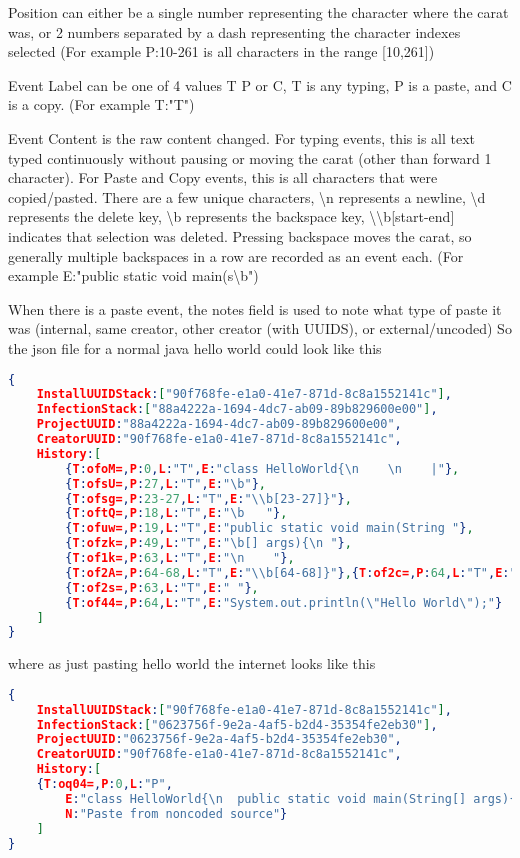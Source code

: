 \documentclass[12pt,final,thesis,actual]{uhthesis}
\newcommand{\n}{\hfill\break}
\begin{document}
Position can either be a single number representing the character where the carat was, or 2 numbers separated by a dash representing the character indexes selected (For example P:10-261 is all characters in the range [10,261])

Event Label can be one of 4 values T P or C, T is any typing, P is a paste, and C is a copy. (For example T:"T")

Event Content is the raw content changed.  For typing events, this is all text typed continuously without pausing or moving the carat (other than forward 1 character).  For Paste and Copy events, this is all characters that were copied/pasted.  There are a few unique characters, \textbackslash{}n represents a newline, \textbackslash{}d represents the delete key, \textbackslash{}b represents the backspace key, \textbackslash{}\textbackslash{}b[start-end] indicates that selection was deleted.  Pressing backspace moves the carat, so generally multiple backspaces in a row are recorded as an event each.    (For example E:"public static void main(s\textbackslash{}b")

When there is a paste event, the notes field is used to note what type of paste it was (internal, same creator, other creator (with UUIDS), or external/uncoded)
So the json file for a normal java hello world could look like this 
\begin{lstlisting}[language=json]
{
	InstallUUIDStack:["90f768fe-e1a0-41e7-871d-8c8a1552141c"],
	InfectionStack:["88a4222a-1694-4dc7-ab09-89b829600e00"],
	ProjectUUID:"88a4222a-1694-4dc7-ab09-89b829600e00",
	CreatorUUID:"90f768fe-e1a0-41e7-871d-8c8a1552141c",
	History:[
		{T:ofoM=,P:0,L:"T",E:"class HelloWorld{\n    \n    |"},
		{T:ofsU=,P:27,L:"T",E:"\b"},
		{T:ofsg=,P:23-27,L:"T",E:"\\b[23-27]}"},
		{T:oftQ=,P:18,L:"T",E:"\b	"},
		{T:ofuw=,P:19,L:"T",E:"public static void main(String "},
		{T:ofzk=,P:49,L:"T",E:"\b[] args){\n "},
		{T:of1k=,P:63,L:"T",E:"\n    "},
		{T:of2A=,P:64-68,L:"T",E:"\\b[64-68]}"},{T:of2c=,P:64,L:"T",E:"	"},
		{T:of2s=,P:63,L:"T",E:"	"},
		{T:of44=,P:64,L:"T",E:"System.out.println(\"Hello World\");"}
	]
}
\end{lstlisting}
where as just pasting hello world the internet looks like this
\begin{lstlisting}[language=json]
{
	InstallUUIDStack:["90f768fe-e1a0-41e7-871d-8c8a1552141c"],
	InfectionStack:["0623756f-9e2a-4af5-b2d4-35354fe2eb30"],
	ProjectUUID:"0623756f-9e2a-4af5-b2d4-35354fe2eb30",
	CreatorUUID:"90f768fe-e1a0-41e7-871d-8c8a1552141c",
	History:[
	{T:oq04=,P:0,L:"P",
		E:"class HelloWorld{\n	public static void main(String[] args){\n    	System.out.println(\"Hello World\");\n	}\n}",
		N:"Paste from noncoded source"}
	]
}
\end{lstlisting}
\end{document}

